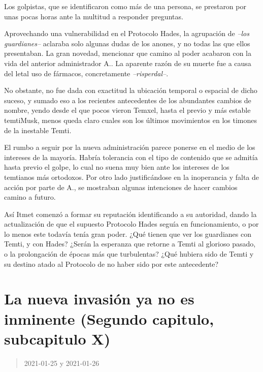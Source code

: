 \documentclass[
  spanish,
]{book}
\begin{document}
Los golpistas, que se identificaron como más de una persona, se prestaron por unas pocas horas ante la multitud a responder preguntas.

Aprovechando una vulnerabilidad en el Protocolo Hades, la agrupación de \emph{--los guardianes--} aclaraba solo algunas dudas de los anones, y no todas las que ellos presentaban. La gran novedad, mencionar que camino al poder acabaron con la vida del anterior administrador A.. La aparente razón de su muerte fue a causa del letal uso de fármacos, concretamente \emph{--risperdal--}.

No obstante, no fue dada con exactitud la ubicación temporal o espacial de dicho suceso, y sumado eso a los recientes antecedentes de los abundantes cambios de nombre, yendo desde el que pocos vieron Temxel, hasta el previo y más estable temtiMusk, menos queda claro cuales son los últimos movimientos en los timones de la inestable Temti.

El rumbo a seguir por la nueva administración parece ponerse en el medio de los intereses de la mayoría. Habría tolerancia con el tipo de contenido que se admitía hasta previo el golpe, lo cual no suena muy bien ante los intereses de los temtianos más ortodoxos. Por otro lado justificándose en la inoperancia y falta de acción por parte de A., se mostraban algunas intenciones de hacer cambios camino a futuro.

Así Itmet comenzó a formar su reputación identificando a su autoridad, dando la actualización de que el supuesto Protocolo Hades seguía en funcionamiento, o por lo menos este todavía tenía gran poder. ¿Qué tienen que ver los guardianes con Temti, y con Hades? ¿Serán la esperanza que retorne a Temti al glorioso pasado, o la prolongación de épocas más que turbulentas? ¿Qué hubiera sido de Temti y su destino atado al Protocolo de no haber sido por este antecedente?

\hypertarget{la-nueva-invasiuxf3n-ya-no-es-inminente-segundo-capitulo-subcapitulo-x}{%
\section{La nueva invasión ya no es inminente (Segundo capitulo, subcapitulo X)}\label{la-nueva-invasiuxf3n-ya-no-es-inminente-segundo-capitulo-subcapitulo-x}}

\begin{quote}
2021-01-25 y 2021-01-26
\end{quote}
\end{document}
